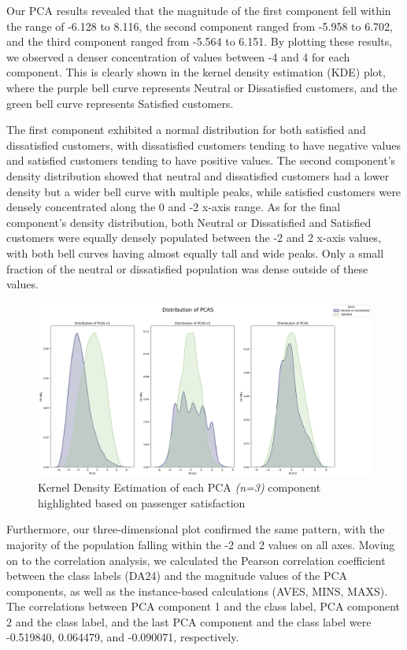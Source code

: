 \documentclass[11pt]{article}
\begin{document}
Our PCA results revealed that the magnitude of the first component fell within the range of -6.128 to 8.116, the second component ranged from -5.958 to 6.702, and the third component ranged from -5.564 to 6.151. By plotting these results, we observed a denser concentration of values between -4 and 4 for each component. This is clearly shown in the kernel density estimation (KDE) plot, where the purple bell curve represents Neutral or Dissatisfied customers, and the green bell curve represents Satisfied customers.

The first component exhibited a normal distribution for both satisfied and dissatisfied customers, with dissatisfied customers tending to have negative values and satisfied customers tending to have positive values. The second component's density distribution showed that neutral and dissatisfied customers had a lower density but a wider bell curve with multiple peaks, while satisfied customers were densely concentrated along the 0 and -2 x-axis range. As for the final component's density distribution, both Neutral or Dissatisfied and Satisfied customers were equally densely populated between the -2 and 2 x-axis values, with both bell curves having almost equally tall and wide peaks. Only a small fraction of the neutral or dissatisfied population was dense outside of these values.

\begin{figure}[h]
\centering
\includegraphics[width=0.9\linewidth]{project_files/project_37_1.png}
\caption{
\centering
Kernel Density Estimation of each PCA \emph{(n=3)} component highlighted based on passenger satisfaction}
\end{figure}

Furthermore, our three-dimensional plot confirmed the same pattern, with the majority of the population falling within the -2 and 2 values on all axes. Moving on to the correlation analysis, we calculated the Pearson correlation coefficient between the class labels (DA24) and the magnitude values of the PCA components, as well as the instance-based calculations (AVES, MINS, MAXS). The correlations between PCA component 1 and the class label, PCA component 2 and the class label, and the last PCA component and the class label were -0.519840, 0.064479, and -0.090071, respectively.
\end{document}
